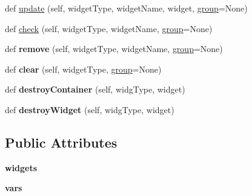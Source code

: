 \begin{DoxyCompactItemize}
\item 
def \hyperlink{classappjar_1_1_widget_manager_adcb0832cb43e8322c7510daf805cb825}{update} (self, widget\+Type, widget\+Name, widget, \hyperlink{classappjar_1_1_widget_manager_a27966c0641e12877b49f89d68119777c}{group}=None)
\item 
def \hyperlink{classappjar_1_1_widget_manager_a51183226169b8a80f750d0c68b7eeb95}{check} (self, widget\+Type, widget\+Name, \hyperlink{classappjar_1_1_widget_manager_a27966c0641e12877b49f89d68119777c}{group}=None)
\item 
\mbox{\label{classappjar_1_1_widget_manager_abf70b9dae145bc50b05970f39e20e4a3}} 
def {\bfseries remove} (self, widget\+Type, widget\+Name, \hyperlink{classappjar_1_1_widget_manager_a27966c0641e12877b49f89d68119777c}{group}=None)
\item 
\mbox{\label{classappjar_1_1_widget_manager_a209023e4544000df1a073ee9275a7bd2}} 
def {\bfseries clear} (self, widget\+Type, \hyperlink{classappjar_1_1_widget_manager_a27966c0641e12877b49f89d68119777c}{group}=None)
\item 
\mbox{\label{classappjar_1_1_widget_manager_ac38ac51a7d31fd820fef1045ef6146fb}} 
def {\bfseries destroy\+Container} (self, widg\+Type, widget)
\item 
\mbox{\label{classappjar_1_1_widget_manager_a4608b351cc17d30af3adf63523181c41}} 
def {\bfseries destroy\+Widget} (self, widg\+Type, widget)
\end{DoxyCompactItemize}
\subsection*{Public Attributes}
\begin{DoxyCompactItemize}
\item 
\mbox{\label{classappjar_1_1_widget_manager_a568550c08b98d9b3c20593c872a7b01e}} 
{\bfseries widgets}
\item 
\mbox{\label{classappjar_1_1_widget_manager_aee9054e43dbe6e38db4aaebaa9929b9f}} 
{\bfseries vars}
\end{DoxyCompactItemize}
